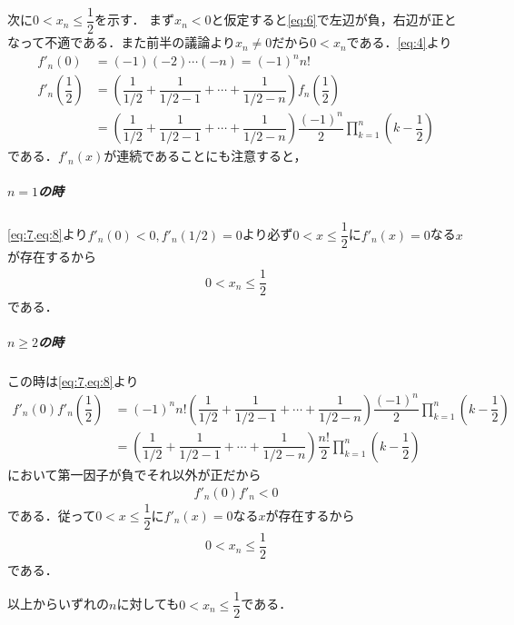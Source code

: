 \documentclass[../../main.tex]{subfiles}
\begin{document}
次に$0<x_n\le\dfrac{1}{2}$を示す．
まず$x_n<0$と仮定すると\cref{eq:6}で左辺が負，右辺が正となって不適である．また前半の議論より$x_n \neq 0$だから$0 < x_n$である．\cref{eq:4}より
\begin{align}
  f'_n(0) &= (-1)(-2)\cdots (-n) = (-1)^{n}n! \label{eq:7}\\
  f'_n\left(\dfrac{1}{2}\right)
  &= \left(\dfrac{1}{1/2}+\dfrac{1}{1/2-1}+\cdots+\dfrac{1}{1/2-n}\right)f_n\left(\dfrac{1}{2}\right) \\
  &= \left(\dfrac{1}{1/2}+\dfrac{1}{1/2-1}+\cdots+\dfrac{1}{1/2-n}\right)\dfrac{(-1)^{n}}{2}\prod_{k=1}^{n}\left(k-\dfrac{1}{2}\right) \label{eq:8}
\end{align}
である．$f'_n(x)$が連続であることにも注意すると，

\subparagraph{$n=1$の時}

\cref{eq:7,eq:8}より$f'_n(0)<0, f'_n(1/2)=0$より必ず$0<x \le \dfrac{1}{2}$に$f'_n(x)=0$なる$x$が存在するから
\begin{align}
  0< x_n \le \dfrac{1}{2}
\end{align}
である．

\subparagraph{$n \ge 2$の時}

この時は\cref{eq:7,eq:8}より
\begin{align}
  f'_n(0)f'_n\left(\dfrac{1}{2}\right)
  &= (-1)^{n}n!\left(\dfrac{1}{1/2}+\dfrac{1}{1/2-1}+\cdots+\dfrac{1}{1/2-n}\right)\dfrac{(-1)^{n}}{2}\prod_{k=1}^{n}\left(k-\dfrac{1}{2}\right) \\
  &= \left(\dfrac{1}{1/2}+\dfrac{1}{1/2-1}+\cdots+\dfrac{1}{1/2-n}\right)\dfrac{n!}{2}\prod_{k=1}^{n}\left(k-\dfrac{1}{2}\right)
\end{align}
において第一因子が負でそれ以外が正だから
\begin{align}
  f'_n(0)f'_n < 0
\end{align}
である．従って$0<x \le \dfrac{1}{2}$に$f'_n(x)=0$なる$x$が存在するから
\begin{align}
  0< x_n \le \dfrac{1}{2}
\end{align}
である．
\casesend

以上からいずれの$n$に対しても$0<x_n \le \dfrac{1}{2}$である．
\end{document}
